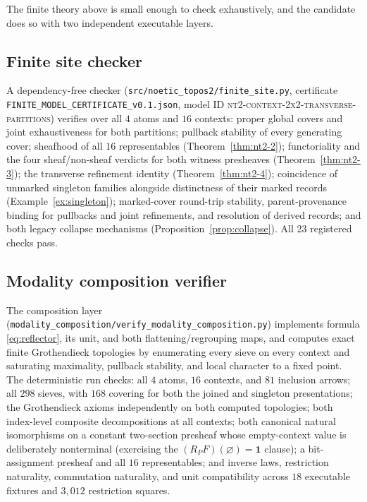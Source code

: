 \documentclass[11pt]{amsart}
\theoremstyle{definition}
\theoremstyle{remark}
\begin{document}
The finite theory above is small enough to check exhaustively, and the candidate does so with two independent executable layers.

\subsection{Finite site checker}
A dependency-free checker (\texttt{src/noetic\_topos2/finite\_site.py}, certificate \texttt{FINITE\_MODEL\_CERTIFICATE\_v0.1.json}, model ID \textsc{nt2-context-2x2-transverse-partitions}) verifies over all $4$ atoms and $16$ contexts: proper global covers and joint exhaustiveness for both partitions; pullback stability of every generating cover; sheafhood of all $16$ representables (Theorem~\ref{thm:nt2-2}); functoriality and the four sheaf/non-sheaf verdicts for both witness presheaves (Theorem~\ref{thm:nt2-3}); the transverse refinement identity (Theorem~\ref{thm:nt2-4}); coincidence of unmarked singleton families alongside distinctness of their marked records (Example~\ref{ex:singleton}); marked-cover round-trip stability, parent-provenance binding for pullbacks and joint refinements, and resolution of derived records; and both legacy collapse mechanisms (Proposition~\ref{prop:collapse}). All 23 registered checks pass.

\subsection{Modality composition verifier}
The composition layer (\texttt{modality\_composition/verify\_modality\_composition.py}) implements formula \eqref{eq:reflector}, its unit, and both flattening/regrouping maps, and computes exact finite Grothendieck topologies by enumerating every sieve on every context and saturating maximality, pullback stability, and local character to a fixed point. The deterministic run checks: all $4$ atoms, $16$ contexts, and $81$ inclusion arrows; all $298$ sieves, with $168$ covering for both the joined and singleton presentations; the Grothendieck axioms independently on both computed topologies; both index-level composite decompositions at all contexts; both canonical natural isomorphisms on a constant two-section presheaf whose empty-context value is deliberately nonterminal (exercising the $(R_PF)(\varnothing)=\mathbf{1}$ clause); a bit-assignment presheaf and all $16$ representables; and inverse laws, restriction naturality, commutation naturality, and unit compatibility across $18$ executable fixtures and $3{,}012$ restriction squares.
\end{document}
